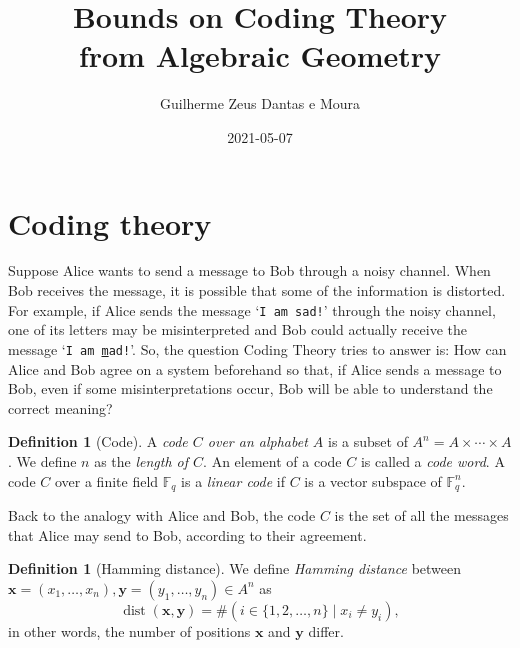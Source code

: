 \documentclass[11pt, oneside]{amsart}
\title[Codes from Algebraic Geometry]{Bounds on Coding Theory\\from Algebraic Geometry}
\author{Guilherme Zeus Dantas e Moura}
\date{2021-05-07} %
\theoremstyle{definition}
\newtheorem{defn}[thm]{Definition}
\theoremstyle{remark}
\numberwithin{equation}{section}
\DeclareMathOperator{\dist}{dist}
\begin{document}
%    

\maketitle

\section{Coding theory} \label{s:codingtheory}

Suppose Alice wants to send a message to Bob through a noisy channel.
When Bob receives the message, it is possible that some of the information is distorted.
For example, if Alice sends the message `\texttt{I am sad!}' through the noisy channel, one of its letters may be misinterpreted and Bob could actually receive the message `\texttt{I am \underline{m}ad!}'.
So, the question Coding Theory tries to answer is:
How can Alice and Bob agree on a system beforehand so that, if Alice sends a message to Bob, even if some misinterpretations occur, Bob will be able to understand the correct meaning?

\begin{defn}[Code] \label{defn:code}
    A \emph{code $C$ over an alphabet $A$} is a subset of $A^n = A \times \cdots \times A$.
    We define $n$ as the \emph{length of $C$}.
	An element of a code $C$ is called a \emph{code word}.
	A code $C$ over a finite field $\mathbb{F}_q$ is a \emph{linear code} if $C$ is a vector subspace of $\mathbb{F}_q^n$.
\end{defn}

Back to the analogy with Alice and Bob, the code $C$ is the set of all the messages that Alice may send to Bob, according to their agreement.

\begin{defn}[Hamming distance] \label{defn:hamming}
    We define \emph{Hamming distance} between $\mathbf{x} = (x_1, \dots, x_n), \mathbf{y} = (y_1, \dots, y_n) \in A^n$ as
    \begin{equation}
		\dist(\mathbf{x}, \mathbf{y}) = \#\left(i \in \{1, 2, \dots, n\} \mid x_i \neq y_i\right),
	\end{equation}
    in other words, the number of positions $\mathbf{x}$ and $\mathbf{y}$ differ.
\end{defn}
\end{document}
